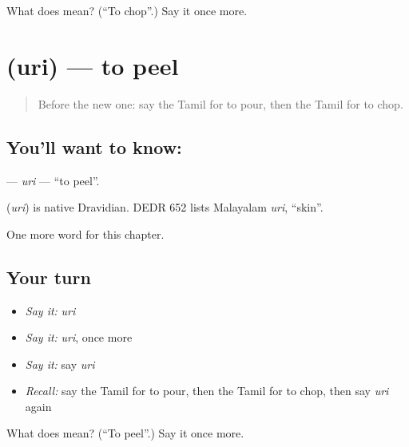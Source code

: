 \begin{tcolorbox}[breakable,colback=teal!4,colframe=teal!35!black,title={Before you move on}]
What does  mean? (\textquotedblleft{}To chop\textquotedblright{}.) Say it once more.
\end{tcolorbox}
\section[\texorpdfstring{\ta{உரி} (uri)}{உரி (uri)}]{ (uri) — to peel}

\label{lesson:TA-C194-uri}



\begin{quote}
Before the new one: say the Tamil for to pour, then the Tamil for to chop.
\end{quote}

\subsection*{You'll want to know: }
\textbf{} — \emph{uri} — \textquotedblleft{}to peel\textquotedblright{}.

\begin{cousinweb}
\textbf{} (\emph{uri}) is native Dravidian. DEDR 652 lists Malayalam \emph{uri}, \textquotedblleft{}skin\textquotedblright{}.
\end{cousinweb}

\begin{grammarlens}[title={What you've built}]
One more word for this chapter.
\end{grammarlens}

\subsection*{Your turn}
\begin{itemize}
\raggedright
  \item \emph{Say it:} \emph{uri}
  \item \emph{Say it:} \emph{uri}, once more
  \item \emph{Say it:} say \emph{uri}
  \item \emph{Recall:} say the Tamil for to pour, then the Tamil for to chop, then say \emph{uri} again
\end{itemize}

\begin{tcolorbox}[breakable,colback=teal!4,colframe=teal!35!black,title={Before you move on}]
What does  mean? (\textquotedblleft{}To peel\textquotedblright{}.) Say it once more.
\end{tcolorbox}
